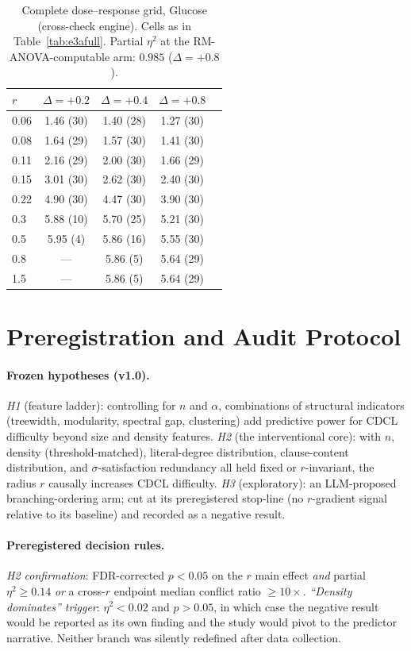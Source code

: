 \documentclass[pdflatex,sn-basic,Numbered]{sn-jnl}
\begin{document}
\begin{appendices}
\begin{table}[h]
\centering
\caption{Complete dose--response grid, Glucose (cross-check engine). Cells as
in Table~\ref{tab:e3afull}. Partial $\eta^2$ at the RM-ANOVA-computable arm:
$0.985$ ($\Delta{=}{+}0.8$).}
\label{tab:e3afullg}
\begin{tabular}{lcccc}
\toprule
$r$ & $\Delta{=}{+}0.2$ & $\Delta{=}{+}0.4$ & $\Delta{=}{+}0.8$\\
\midrule
0.06 & 1.46 (30) & 1.40 (28) & 1.27 (30)\\
0.08 & 1.64 (29) & 1.57 (30) & 1.41 (30)\\
0.11 & 2.16 (29) & 2.00 (30) & 1.66 (29)\\
0.15 & 3.01 (30) & 2.62 (30) & 2.40 (30)\\
0.22 & 4.90 (30) & 4.47 (30) & 3.90 (30)\\
0.3 & 5.88 (10) & 5.70 (25) & 5.21 (30)\\
0.5 & 5.95 (4) & 5.86 (16) & 5.55 (30)\\
0.8 & --- & 5.86 (5) & 5.64 (29)\\
1.5 & --- & 5.86 (5) & 5.64 (29)\\
\bottomrule
\end{tabular}
\end{table}

\section{Preregistration and Audit Protocol}
\label{app:protocol}

\paragraph{Frozen hypotheses (v1.0).}
\emph{H1} (feature ladder): controlling for $n$ and $\alpha$, combinations of
structural indicators (treewidth, modularity, spectral gap, clustering) add
predictive power for CDCL difficulty beyond size and density features.
\emph{H2} (the interventional core): with $n$, density (threshold-matched),
literal-degree distribution, clause-content distribution, and
$\sigma$-satisfaction redundancy all held fixed or $r$-invariant, the radius
$r$ causally increases CDCL difficulty. \emph{H3} (exploratory): an
LLM-proposed branching-ordering arm; cut at its preregistered stop-line
(no $r$-gradient signal relative to its baseline) and recorded as a negative
result.

\paragraph{Preregistered decision rules.}
\emph{H2 confirmation}: FDR-corrected $p<0.05$ on the $r$ main effect
\emph{and} partial $\eta^2 \ge 0.14$ \emph{or} a cross-$r$ endpoint median
conflict ratio $\ge 10\times$. \emph{``Density dominates'' trigger}:
$\eta^2 < 0.02$ and $p>0.05$, in which case the negative result would be
reported as its own finding and the study would pivot to the predictor
narrative. Neither branch was silently redefined after data collection.


\end{appendices}
\end{document}
